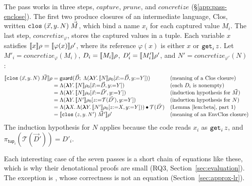 The  pass works in three steps, $\mathit{capture}$,
$\mathit{prune}$, and $\mathit{concretize}$ (\S\ref{app:pass-enclose}).
The first two produce closures of an intermediate language, Clos,
written $\mathtt{clos}\;(\vec{x}, y.\,N)\;\vec{M}$, which bind a name
$x_i$ for each captured value $M_i$. The last step, $\mathit{concretize}_\varphi$,
stores the captured values in a tuple. Each variable $x$ satisfies $\llbracket x \rrbracket\rho = \llbracket \varphi(x) \rrbracket\rho'$, where
its reference $\varphi(x)$ is either $x$ or $\mathtt{get}_i\,z$. Let $M'_i = \mathit{concretize}_\varphi(M_i)$,
$D_i = \llbracket M_i \rrbracket\rho$, $D'_i = \llbracket M'_i \rrbracket\rho'$, and
$N' = \mathit{concretize}_{\varphi'}(N)$:
{\small
\[
\begin{array}{@{}r@{\;}c@{\;}l@{\quad}l@{}}
  \den{\kw{clos}\;(\vec{x}, y.\,N)\;\vec{M}}\rho
    & = & \mathsf{guard}(\vec{D};\; \Lambda(\mlam{Y} \den{N}\rho_0[\vec{x}{:=}\vec{D}, y{:=}Y])) & \text{(meaning of a Clos closure)}\\
    & = & \Lambda(\mlam{Y} \den{N}\rho_0[\vec{x}{:=}\vec{D}, y{:=}Y]) & \text{(each $D_i$ is nonempty)}\\
    & = & \Lambda(\mlam{Y} \den{N}\rho_0[\vec{x}{:=}\vec{D}', y{:=}Y]) & \text{(induction hypothesis for $\vec{M}$)}\\
    & = & \Lambda(\mlam{Y} \den{N'}\rho_0[z{:=}\mathcal{T}(\vec{D}'), y{:=}Y]) & \text{(induction hypothesis for $N$)}\\
    & = & \Lambda(\mlam{X} \Lambda(\mlam{Y} \den{N'}\rho_0[z{:=}X, y{:=}Y])) \app \mathcal{T}(\vec{D}') & \text{(Lemma~\ref{lem:beta}, part 1)}\\
    & = & \den{\kw{clos}\;(z, y.\,N')\;\vec{M}'}\rho' & \text{(meaning of an EnvClos closure)}
\end{array}
\]}
The induction hypothesis for $N$ applies because the code reads $x_i$ as
$\mathtt{get}_i\,z$, and $\pi_{\mathsf{tup}_i}(\mathcal{T}(\vec{D}')) =
D'_i$.

Each interesting case of the seven passes is a short chain of
equations like these, which is why their denotational proofs are small
(RQ3, Section~\ref{sec:evaluation}). The exception is , whose correctness is not an equation
(Section~\ref{sec:approx-lr}).


